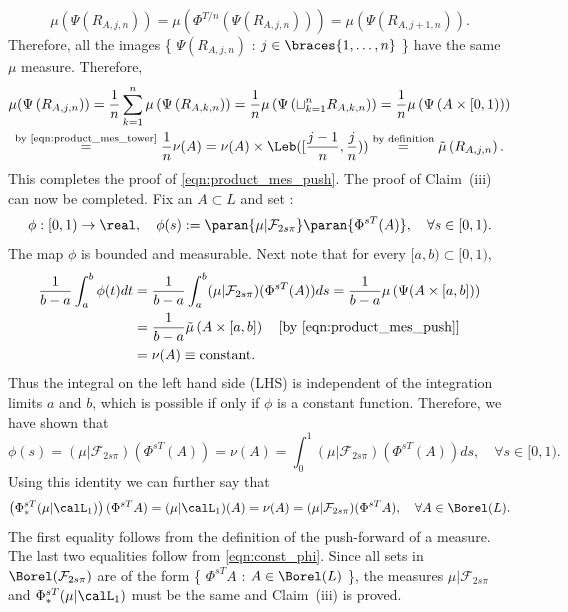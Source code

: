 \documentclass[12pt,oneside]{article}
\newcommand{\Fol}{\mathcal{F}}
\newcommand{\MesL}{\nu}
\newcommand{\Iso}{\Psi}
\begin{document}
%
\[\mu\left(\Iso(R_{A,j,n})\right) = \mu\left(\Phi^{T/n}\left(\Iso(R_{A,j,n})\right)\right) = \mu\left(\Iso(R_{A,j+1,n})\right).\]
%
Therefore, all the images \{ $\Iso\left(R_{A,j,n}\right)$ : $j\in \braces{1,\ldots,n}$ \}  have the same $\mu$ measure. Therefore, 
\[\begin{gathered}
\mu(\Iso\left(R_{A,j,n}\right)) = \frac{1}{n} \sum_{k=1}^{n} \mu \left( \Iso\left(R_{A,k,n}\right) \right) = \frac{1}{n} \mu \left( \Iso\left( \sqcup_{k=1}^{n} R_{A,k,n}\right) \right) = \frac{1}{n} \mu\left(\Iso\left(A\times [0,1) \right)\right)\\
 \stackrel{\text{by \eqref{eqn:product_mes_tower}}}{=} \frac{1}{n}\MesL(A) =  \MesL(A)\times\Leb([\frac{j-1}{n},\frac{j}{n})) \stackrel{\text{by definition}}{=} \tilde{\mu}\left(R_{A,j,n}\right).
\end{gathered}\]
%
This completes the proof of \eqref{eqn:product_mes_push}. The proof of Claim~(iii) can now be completed. Fix an $A\subset L$ and set :
%
\[ \phi:[0,1)\to\real, \quad \phi(s) := \paran{ \mu|\Fol_{2s\pi} } \paran{ \Phi^{sT}(A) }, \quad \forall s\in[0,1). \]
%
The map $\phi$ is bounded and measurable. Next note that for every $[a,b)\subset [0,1)$,
%
\[\begin{split}
\frac{1}{b-a}\int_{a}^{b} \phi(t)dt &= \frac{1}{b-a} \int_{a}^{b} (\mu|\Fol_{2s\pi})(\Phi^{sT}(A)) ds = \frac{1}{b-a} \mu\left( \Iso(A\times[a,b]) \right) \\
&= \frac{1}{b-a}\tilde{\mu}\left(A\times [a,b]\right) \quad \mbox{[by \eqref{eqn:product_mes_push}]} \\
&= \MesL(A) \equiv \mbox{constant}.
\end{split}\]
%
Thus the integral on the left hand side (LHS) is independent of the integration limits $a$ and $b$, which is possible if only if $\phi$ is a constant function. Therefore, we have shown that
%
\begin{equation} \label{eqn:const_phi} 
    \phi(s) = (\mu|\Fol_{2s\pi})(\Phi^{sT}(A)) = \MesL(A) = \int_0^1 (\mu|\Fol_{2s\pi})(\Phi^{sT}(A)) ds, \quad \forall s\in [0,1).
\end{equation}
%
Using this identity we can further say that
%
\[\left( \Phi^{sT}_*(\mu | \calL_1) \right) (\Phi^{sT} A) = (\mu | \calL_1)(A) = \nu(A) =  (\mu|\Fol_{2s\pi})(\Phi^{sT} A), \quad \forall A\in\Borel(L).\]
%
The first equality follows from the definition of the push-forward of a measure. The last two equalities follow from \eqref{eqn:const_phi}. Since all sets in $\Borel(\Fol_{2s\pi})$ are of the form \{ $\Phi^{sT} A$ : $A\in\Borel(L)$ \}, the measures $\mu|\Fol_{2s\pi}$ and $\Phi^{sT}_*(\mu | \calL_1)$ must be the same and Claim~(iii) is proved. 
\end{document}
